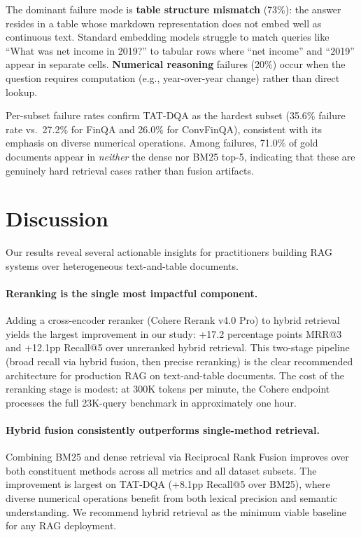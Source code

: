 \documentclass[11pt]{article}
\begin{document}
The dominant failure mode is \textbf{table structure mismatch} (73\%): the answer resides in a table whose markdown representation does not embed well as continuous text. Standard embedding models struggle to match queries like ``What was net income in 2019?'' to tabular rows where ``net income'' and ``2019'' appear in separate cells. \textbf{Numerical reasoning} failures (20\%) occur when the question requires computation (e.g., year-over-year change) rather than direct lookup.

Per-subset failure rates confirm TAT-DQA as the hardest subset (35.6\% failure rate vs.\ 27.2\% for FinQA and 26.0\% for ConvFinQA), consistent with its emphasis on diverse numerical operations. Among failures, 71.0\% of gold documents appear in \emph{neither} the dense nor BM25 top-5, indicating that these are genuinely hard retrieval cases rather than fusion artifacts.

\section{Discussion}
\label{sec:discussion}

Our results reveal several actionable insights for practitioners building RAG systems over heterogeneous text-and-table documents.

\paragraph{Reranking is the single most impactful component.}
Adding a cross-encoder reranker (Cohere Rerank v4.0 Pro) to hybrid retrieval yields the largest improvement in our study: +17.2 percentage points MRR@3 and +12.1pp Recall@5 over unreranked hybrid retrieval. This two-stage pipeline (broad recall via hybrid fusion, then precise reranking) is the clear recommended architecture for production RAG on text-and-table documents. The cost of the reranking stage is modest: at 300K tokens per minute, the Cohere endpoint processes the full 23K-query benchmark in approximately one hour.

\paragraph{Hybrid fusion consistently outperforms single-method retrieval.}
Combining BM25 and dense retrieval via Reciprocal Rank Fusion improves over both constituent methods across all metrics and all dataset subsets. The improvement is largest on TAT-DQA (+8.1pp Recall@5 over BM25), where diverse numerical operations benefit from both lexical precision and semantic understanding. We recommend hybrid retrieval as the minimum viable baseline for any RAG deployment.
\end{document}
